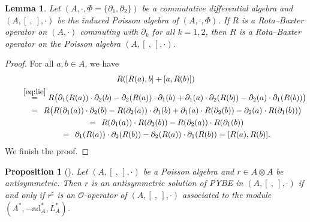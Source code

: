\documentclass[10pt,a4paper]{amsart}
\numberwithin{equation}{section}
\newtheorem{Lemma}[Theorem]{Lemma}
\newtheorem{Proposition}[Theorem]{Proposition}
{ \theoremstyle{definition}
	\newtheorem{Definition}[Theorem]{Definition}
	\newtheorem{Note}[Theorem]{Note}
	\newtheorem{Example}[Theorem]{Example}
	\newtheorem{Remark}[Theorem]{Remark} }
\newcommand{\ad}{\mathrm{ad}}
\begin{document}
\begin{Lemma}\label{lem:rod}
 Let $(A, \cdot, \Phi = \{\partial_1, \partial_2\})$ be a commutative differential algebra and
 $(A, [\ ,\ ], \cdot)$ be the induced Poisson algebra of $(A, \cdot, \Phi)$.
 If $R$ is a Rota--Baxter operator on $(A, \cdot)$ commuting with $\partial_k$ for all $k=1,2$, then $R$ is a Rota--Baxter operator on the Poisson algebra $(A, [\ ,\ ], \cdot)$.
\end{Lemma}
\begin{proof}
 For all $a, b \in A$, we have
 \begin{gather*}
 R([R(a), b] + [a, R(b)]) \\
\qquad{} \overset{\eqref{eq:lie}}{=} R\big(\partial_1(R(a)) \cdot \partial_2(b) - \partial_2(R(a)) \cdot \partial_1(b) + \partial_1(a) \cdot \partial_2(R(b)) - \partial_2(a) \cdot \partial_1(R(b))\big) \\
\qquad{} \overset{\hphantom{(5.1)}}{=} R\big(R(\partial_1(a)) \cdot \partial_2(b) - R(\partial_2(a)) \cdot \partial_1(b) + \partial_1(a) \cdot R(\partial_2(b)) - \partial_2(a) \cdot R(\partial_1(b))\big) \\
 \qquad{}\overset{\hphantom{(5.1)}}{=} R(\partial_1(a)) \cdot R(\partial_2(b)) - R(\partial_2(a)) \cdot R(\partial_1(b)) \\
 \qquad{}\overset{\hphantom{(5.1)}}{=} \partial_1(R(a)) \cdot \partial_2(R(b)) - \partial_2(R(a)) \cdot \partial_1(R(b)) = [R(a), R(b)].
	\end{gather*}
 We finish the proof.
\end{proof}

\begin{Proposition}[{\cite[Proposition~A.6, Theorem~2.4.7]{BaiDouble}}]\label{pro:pybe_o}
 Let $(A, [\ ,\ ], \cdot)$ be a Poisson algebra and $r \in A \otimes A$ be antisymmetric.
 Then $r$ is an antisymmetric solution of PYBE in $(A, [\ ,\ ], \cdot)$ if and only if $r^\sharp$ is an $\mathcal{O}$-operator of $(A, [\ ,\ ], \cdot)$ associated to the module $(A^*, -\ad_A^*, L_A^*)$.
\end{Proposition}
\end{document}
